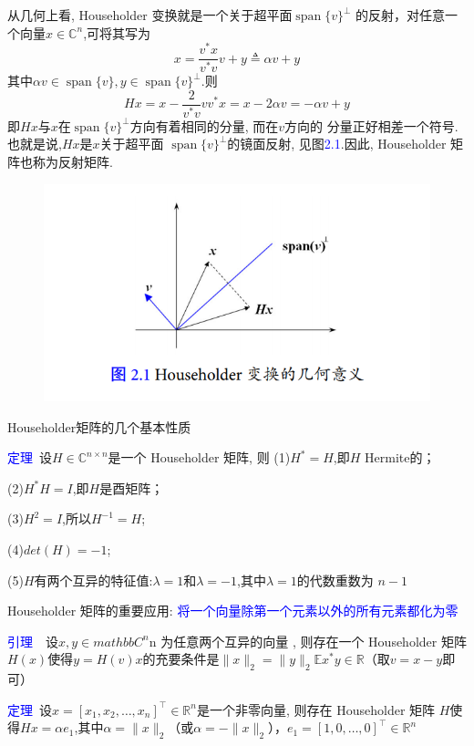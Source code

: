 \documentclass[12pt,a4paper]{article}
\begin{document}
从几何上看, Householder 变换就是一个关于超平面$\operatorname{span}\{v\}^{\perp}$
的反射，对任意一个向量$x \in \mathbb{C}^{n}$,可将其写为$$x=\frac{v^{*} x}{v^{*} v} v+y \triangleq \alpha v+y$$
其中$\alpha v \in \operatorname{span}\{v\}, y \in
\operatorname{span}\{v\}^{\perp}$.则$$H x=x-\frac{2}{v^{*} v} v v^{*} x=x-2 \alpha v=-\alpha v+y$$
即$Hx$与$x$在$\operatorname{span}\{v\}^{\perp}$方向有着相同的分量, 而在$v$方向的
分量正好相差一个符号. 也就是说,$Hx$是$x$关于超平面
$\operatorname{span}\{v\}^{\perp}$的镜面反射, 见图\textcolor{blue}{2.1}.因此, Householder 矩阵也称为反射矩阵.

\begin{figure}
	\centering
	\includegraphics[scale=0.5]{figuresl/figure1.png}
\end{figure}

\noindent Householder矩阵的几个基本性质

\noindent \textcolor{blue}{定理}~设$H \in \mathbb{C}^{n \times n}$是一个 Householder 矩阵, 则
(1)$H^*=H$,即$H$ Hermite的；

(2)$H^*H=I$,即$H$是酉矩阵；

(3)$H^2=I$,所以$H^{-1}=H$;

(4)$det(H)=-1$;

(5)$H$有两个互异的特征值:$\lambda=1$和$\lambda=-1$,其中$\lambda=1$的代数重数为
$n-1$

\noindent Householder 矩阵的重要应用:
\textcolor{blue}{将一个向量除第一个元素以外的所有元素都化为零}

\noindent \textcolor{blue}{引理}~~设$x,y \in mathbb{C}^n$n 为任意两个互异的向量
, 则存在一个 Householder 矩阵$H(x)$使得$y=H(v)x$的充要条件是$\|x\|_{2}=\|y\|_{2}
\mathbb{E} x^{*} y \in \mathbb{R}$（取$v=x-y$即可）

\noindent\textcolor{blue}{定理}~设$x=\left[x_{1}, x_{2}, \ldots,
x_{n}\right]^{\top} \in \mathbb{R}^{n}$是一个非零向量, 则存在 Householder 矩阵
$H$使得$Hx=\alpha e_1$,其中$\alpha=\|x\|_2$（或$\alpha=-\|x\|_2$），$e_1=[1,0, \ldots, 0]^{\top} \in \mathbb{R}^{n}$
\end{document}
